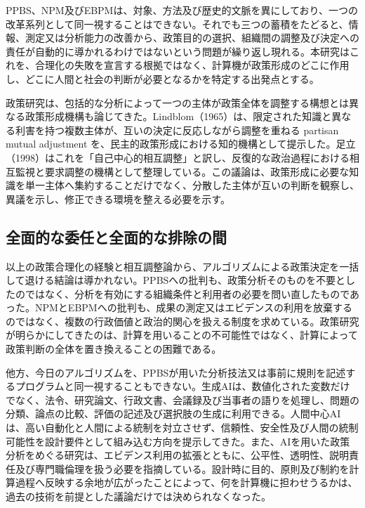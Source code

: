 PPBS、NPM及びEBPMは、対象、方法及び歴史的文脈を異にしており、一つの改革系列として同一視することはできない。それでも三つの蓄積をたどると、情報、測定又は分析能力の改善から、政策目的の選択、組織間の調整及び決定への責任が自動的に導かれるわけではないという問題が繰り返し現れる。本研究はこれを、合理化の失敗を宣言する根拠ではなく、計算機が政策形成のどこに作用し、どこに人間と社会の判断が必要となるかを特定する出発点とする。

政策研究は、包括的な分析によって一つの主体が政策全体を調整する構想とは異なる政策形成機構も論じてきた。Lindblom（1965）は、限定された知識と異なる利害を持つ複数主体が、互いの決定に反応しながら調整を重ねる partisan mutual adjustment を、民主的政策形成における知的機構として提示した\cite{lindblom1965intelligence}。足立（1998）はこれを「自己中心的相互調整」と訳し、反復的な政治過程における相互監視と要求調整の機構として整理している\cite{adachi1998inefficiency}。この議論は、政策形成に必要な知識を単一主体へ集約することだけでなく、分散した主体が互いの判断を観察し、異議を示し、修正できる環境を整える必要を示す。

\subsection{全面的な委任と全面的な排除の間}
\label{subsec:intro_between_delegation_and_rejection}

以上の政策合理化の経験と相互調整論から、アルゴリズムによる政策決定を一括して退ける結論は導かれない。PPBSへの批判も、政策分析そのものを不要としたのではなく、分析を有効にする組織条件と利用者の必要を問い直したものであった\cite{wildavsky1969ppbs}。NPMとEBPMへの批判も、成果の測定又はエビデンスの利用を放棄するのではなく、複数の行政価値と政治的関心を扱える制度を求めている\cite{hood1991npm,parkhurst2017politics}。政策研究が明らかにしてきたのは、計算を用いることの不可能性ではなく、計算によって政策判断の全体を置き換えることの困難である。

他方、今日のアルゴリズムを、PPBSが用いた分析技法又は事前に規則を記述するプログラムと同一視することもできない。生成AIは、数値化された変数だけでなく、法令、研究論文、行政文書、会議録及び当事者の語りを処理し、問題の分類、論点の比較、評価の記述及び選択肢の生成に利用できる。人間中心AIは、高い自動化と人間による統制を対立させず、信頼性、安全性及び人間の統制可能性を設計要件として組み込む方向を提示してきた\cite{shneiderman2022}。また、AIを用いた政策分析をめぐる研究は、エビデンス利用の拡張とともに、公平性、透明性、説明責任及び専門職倫理を扱う必要を指摘している\cite{newman2023mapping}。設計時に目的、原則及び制約を計算過程へ反映する余地が広がったことによって、何を計算機に担わせうるかは、過去の技術を前提とした議論だけでは決められなくなった。

